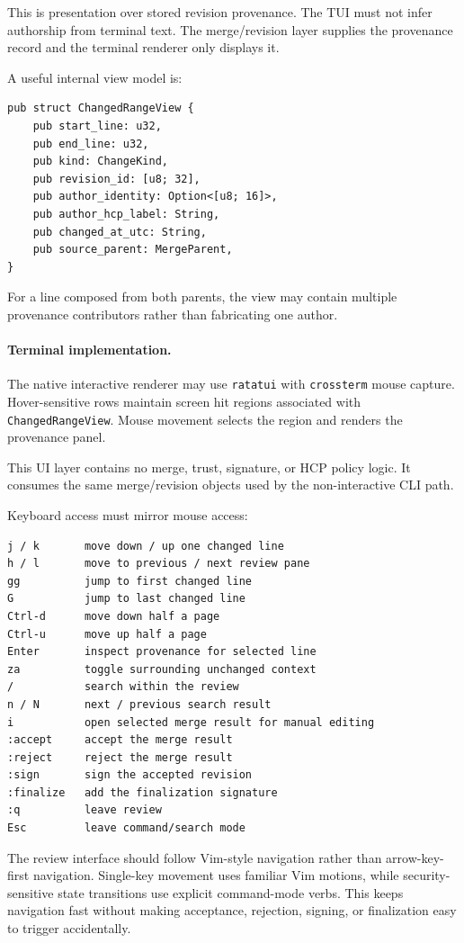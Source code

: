 \documentclass[11pt]{article}
\begin{document}
This is presentation over stored revision provenance. The TUI must not infer authorship from terminal text. The merge/revision layer supplies the provenance record and the terminal renderer only displays it.

A useful internal view model is:

\begin{lstlisting}
pub struct ChangedRangeView {
    pub start_line: u32,
    pub end_line: u32,
    pub kind: ChangeKind,
    pub revision_id: [u8; 32],
    pub author_identity: Option<[u8; 16]>,
    pub author_hcp_label: String,
    pub changed_at_utc: String,
    pub source_parent: MergeParent,
}
\end{lstlisting}

For a line composed from both parents, the view may contain multiple provenance contributors rather than fabricating one author.

\paragraph{Terminal implementation.}

The native interactive renderer may use \texttt{ratatui} with \texttt{crossterm} mouse capture. Hover-sensitive rows maintain screen hit regions associated with \texttt{ChangedRangeView}. Mouse movement selects the region and renders the provenance panel.

This UI layer contains no merge, trust, signature, or HCP policy logic. It consumes the same merge/revision objects used by the non-interactive CLI path.

Keyboard access must mirror mouse access:

\begin{lstlisting}
j / k       move down / up one changed line
h / l       move to previous / next review pane
gg          jump to first changed line
G           jump to last changed line
Ctrl-d      move down half a page
Ctrl-u      move up half a page
Enter       inspect provenance for selected line
za          toggle surrounding unchanged context
/           search within the review
n / N       next / previous search result
i           open selected merge result for manual editing
:accept     accept the merge result
:reject     reject the merge result
:sign       sign the accepted revision
:finalize   add the finalization signature
:q          leave review
Esc         leave command/search mode
\end{lstlisting}

The review interface should follow Vim-style navigation rather than arrow-key-first navigation. Single-key movement uses familiar Vim motions, while security-sensitive state transitions use explicit command-mode verbs. This keeps navigation fast without making acceptance, rejection, signing, or finalization easy to trigger accidentally.
\end{document}

